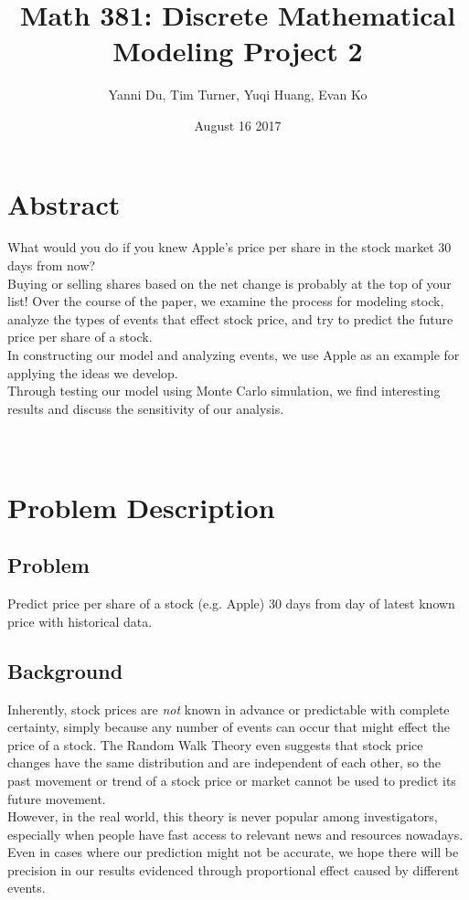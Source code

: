 \documentclass{article}
\title{Math 381: Discrete Mathematical Modeling Project 2}
\author{Yanni Du, Tim Turner, Yuqi Huang, Evan Ko }
\affil{University of Washington}
\date{August 16 2017}
\begin{document}
	
\maketitle
\newpage
\tableofcontents
\newpage

\section{Abstract}

What would you do if you knew Apple's price per share in the stock market 30 days from now? \\
Buying or selling shares based on the net change is probably at the top of your list!
Over the course of the paper, we examine the process for modeling stock, analyze the types of events that effect stock price, and try to predict the future price per share of a stock. \\
In constructing our model and analyzing events, we use Apple as an example for applying the ideas we develop. \\
Through testing our model using Monte Carlo simulation, we find interesting results and discuss the sensitivity of our analysis. \\
 \\
 \\

\section{Problem Description}
\subsection{Problem}

Predict price per share of a stock (e.g. Apple) 30 days from day of latest known price with historical data.\\

\subsection{Background}
Inherently, stock prices are \textit{not} known in advance or predictable with complete certainty, simply because any number of events can occur that might effect the price of a stock. The Random Walk Theory even suggests that stock price changes have the same distribution and are independent of each other, so the past movement or trend of a stock price or market cannot be used to predict its future movement.\cite{RW}\\
However, in the real world, this theory is never popular among investigators, especially when people have fast access to relevant news and resources nowadays. Even in cases where our prediction might not be accurate, we hope there will be precision in our results evidenced through proportional effect caused by different events.
\end{document}
